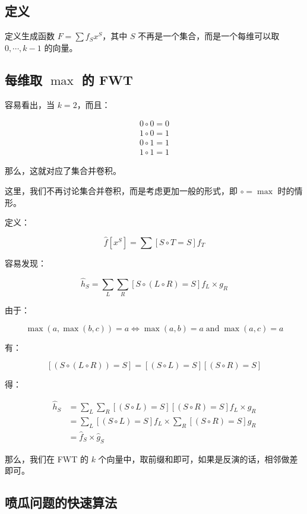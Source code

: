 \documentclass{article}
\begin{document}
\subsection{定义}

定义生成函数 $F=\sum f_S x^S$，其中 $S$ 不再是一个集合，而是一个每维可以取 $0,\cdots ,k-1$ 的向量。

\subsection{每维取 $\max$ 的 FWT}

容易看出，当 $k=2$，而且：

$$\begin{aligned}0 \circ 0 = 0 \\ 1 \circ 0 = 1 \\ 0 \circ 1 = 1 \\ 1 \circ 1 = 1\end{aligned}$$

那么，这就对应了集合并卷积。

这里，我们不再讨论集合并卷积，而是考虑更加一般的形式，即 $\circ = \max$ 时的情形。

定义：

$$\hat f[x^S]=\sum[S \circ T=S] f_T$$

容易发现：

$$\hat h_S=\sum_{L}\sum_{R}[S \circ (L \circ R) = S] f_L \times g_R$$

由于：

$$\max(a,\max(b,c))=a \Leftrightarrow \max(a,b)=a \operatorname{and} \max(a,c)=a$$

有：

$$[(S \circ (L \circ R))=S]=[(S \circ L) =S][(S \circ R)=S]$$

得：

$$\begin{aligned} \hat h_S &= \sum_{L} \sum_{R} [(S \circ L) =S][(S \circ R)=S] f_L \times g_R \\ &= \sum_{L} [(S \circ L)=S] f_L \times \sum_{R} [(S \circ R)=S] g_R \\ &= \hat f_S \times \hat g_S\end{aligned}$$


那么，我们在 FWT 的 $k$ 个向量中，取前缀和即可，如果是反演的话，相邻做差即可。

\subsection{喷瓜问题的快速算法}
\end{document}
